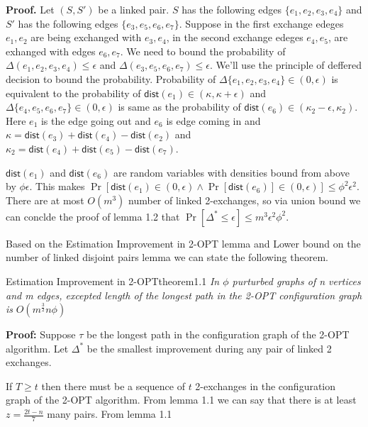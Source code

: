 \documentclass[12pt, a4paper]{article}
\begin{document}
\textbf{Proof.} Let $(S, S')$ be a linked pair. $S$ has the following edges $\{e_1, e_2, e_3, e_4\}$
and $S'$ has the following edges $\{e_3, e_5, e_6, e_7\}$. Suppose in the first exchange edeges $e_1, e_2$
are being exchanged with $e_3, e_4$, in the second exchange edeges $e_4, e_5$, are exhanged with edges
$e_6, e_7$. We need to bound the probability of $\Delta(e_1, e_2, e_3, e_4) \leq \epsilon$ and $\Delta(e_3, e_5, e_6, e_7) \leq \epsilon$. We'll use the principle of deffered decision to bound the probability. 
Probability of $\Delta\{e_1, e_2, e_3, e_4\} \in (0, \epsilon)$ is equivalent to the probability of $\textsf{dist}(e_1) \in (\kappa, \kappa + \epsilon)$ and $\Delta\{e_4, e_5, e_6, e_7\} \in (0, \epsilon)$
is same as the probability of $\textsf{dist}(e_6) \in (\kappa_2 - \epsilon, \kappa_2)$. Here $e_1$ is the edge going out and $e_6$ is edge coming in and
$\kappa = \textsf{dist}(e_3) + \textsf{dist}(e_4) - \textsf{dist}(e_2)$ and $\kappa_2 = \textsf{dist}(e_4) + \textsf{dist}(e_5) - \textsf{dist}(e_7)$.

$\textsf{dist}(e_1)$ and $\textsf{dist}(e_6)$ are random variables with densities bound from above
by $\phi\epsilon$. This makes $\Pr[\textsf{dist}(e_1) \in (0, \epsilon) \wedge \Pr[\textsf{dist}(e_6)] \in (0, \epsilon)] \leq \phi^2\epsilon^2$.
There are at most $O(m^3)$ number of linked 2-exchanges, so via union bound we can conclde the proof of lemma
1.2 that $\Pr[\Delta^* \leq \epsilon] \leq m^3\epsilon^2\phi^2$.

Based on the Estimation Improvement in 2-OPT lemma and Lower bound on the number of linked disjoint pairs
lemma we can state the following theorem.

\begin{theo}{Estimation Improvement in 2-OPT}{theorem1.1}
    \textit{In $\phi$ purturbed graphs of n vertices and m edges, excepted length of the longest path
    in the 2-\textsf{OPT} configuration graph is} $O(m^{\frac{3}{2}} n \phi)$
\end{theo}

\textbf{Proof:} Suppose $\tau$ be the longest path in the configuration graph of the
2-\textsf{OPT} algorithm. Let $\Delta^*$ be the smallest improvement during any pair of linked 2 exchanges.

If $T \geq t$ then there must be a sequence of $t$ 2-exchanges in the configuration graph of the 2-\textsf{OPT} algorithm.
From lemma 1.1 we can say that there is at least $z = \frac{2t - n}{7}$ many pairs. From lemma 1.1
\end{document}
